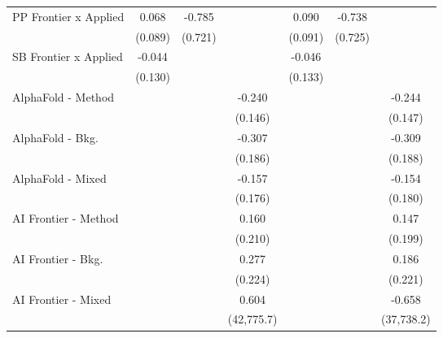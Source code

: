 \begin{tabular}{lcccccc}
   PP Frontier x Applied          & 0.068          & -0.785       &               & 0.090          & -0.738       &   \\   
                                  & (0.089)        & (0.721)      &               & (0.091)        & (0.725)      &   \\   
   SB Frontier x Applied          & -0.044         &              &               & -0.046         &              &   \\   
                                  & (0.130)        &              &               & (0.133)        &              &   \\   
   AlphaFold - Method             &                &              & -0.240        &                &              & -0.244\\   
                                  &                &              & (0.146)       &                &              & (0.147)\\   
   AlphaFold - Bkg.               &                &              & -0.307        &                &              & -0.309\\   
                                  &                &              & (0.186)       &                &              & (0.188)\\   
   AlphaFold - Mixed              &                &              & -0.157        &                &              & -0.154\\   
                                  &                &              & (0.176)       &                &              & (0.180)\\   
   AI Frontier - Method           &                &              & 0.160         &                &              & 0.147\\   
                                  &                &              & (0.210)       &                &              & (0.199)\\   
   AI Frontier - Bkg.             &                &              & 0.277         &                &              & 0.186\\   
                                  &                &              & (0.224)       &                &              & (0.221)\\   
   AI Frontier - Mixed            &                &              & 0.604         &                &              & -0.658\\   
                                  &                &              & (42,775.7)    &                &              & (37,738.2)\\   

\end{tabular}
